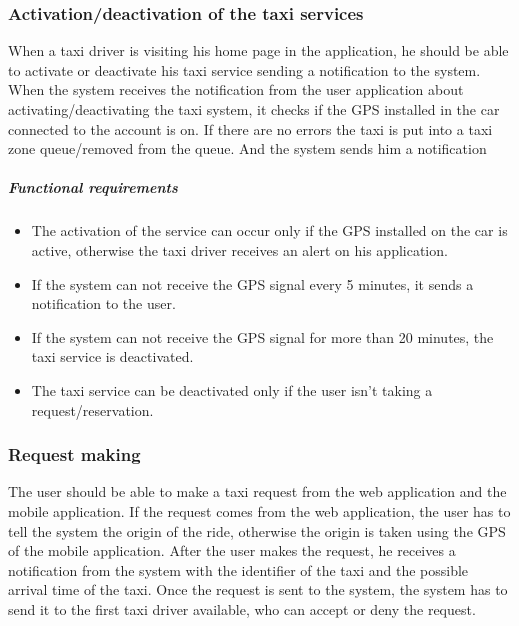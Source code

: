 \subsubsection{Activation/deactivation of the taxi services}
When a taxi driver is visiting his home page in the application, he should be able to activate or deactivate his taxi service sending a notification to the system.
When the system receives the notification from the user application about activating/deactivating the taxi system, it checks if the GPS installed in the car connected to the account is on. If there are no errors the taxi is put into a taxi zone queue/removed from the queue. And the system sends him a notification

	\subparagraph{Functional requirements}
	\noindent
		\begin{itemize}
			\item The activation of the service can occur only if the GPS installed on the car is active, otherwise the taxi driver receives an alert on his application.
			\item If the system can not receive the GPS signal every 5 minutes, it sends a notification to the user.
			\item If the system can not receive the GPS signal for more than 20 minutes, the taxi service is deactivated.
			\item The taxi service can be deactivated only if the user isn't taking a request/reservation.
		\end{itemize} 


\subsubsection{Request making}
The user should be able to make a taxi request from the web application and the mobile application. If the request comes from the web application, the user has to tell the system the origin of the ride, otherwise the origin is taken using the GPS of the mobile application.
After the user makes the request, he receives a notification from the system with the identifier of the taxi and the possible arrival time of the taxi.
Once the request is sent to the system, the system has to send it to the first taxi driver available, who can accept or deny the request.

